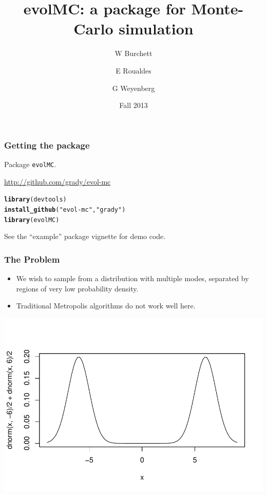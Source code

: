 \documentclass{beamer}\usepackage[]{graphicx}\usepackage[]{color}
\title{evolMC: a package for Monte-Carlo simulation}
\author{W Burchett \and E Roualdes \and G Weyenberg}
\date{Fall 2013}
\makeatletter
\newcommand{\hlstr}[1]{\textcolor[rgb]{0.192,0.494,0.8}{#1}}%
\newcommand{\hlstd}[1]{\textcolor[rgb]{0.345,0.345,0.345}{#1}}%
\newcommand{\hlkwd}[1]{\textcolor[rgb]{0.737,0.353,0.396}{\textbf{#1}}}%
\newenvironment{kframe}{%
 \def\at@end@of@kframe{}%
 \ifinner\ifhmode%
  \def\at@end@of@kframe{\end{minipage}}%
  \begin{minipage}{\columnwidth}%
 \fi\fi%
 \def\FrameCommand##1{\hskip\@totalleftmargin \hskip-\fboxsep
 \colorbox{shadecolor}{##1}\hskip-\fboxsep
     \hskip-\linewidth \hskip-\@totalleftmargin \hskip\columnwidth}%
 \MakeFramed {\advance\hsize-\width
   \@totalleftmargin\z@ \linewidth\hsize
   \@setminipage}}%
 {\par\unskip\endMakeFramed%
 \at@end@of@kframe}
\newenvironment{knitrout}{}{} %
\makeatother
\begin{document}
\begin{frame}
\maketitle
\end{frame}

\begin{frame}[fragile]
  \frametitle{Getting the package}
  Package {\tt evolMC}.
 
  \url{http://github.com/grady/evol-mc}
\begin{knitrout}
\color{fgcolor}\begin{kframe}
\begin{alltt}
\hlkwd{library}\hlstd{(devtools)}
\hlkwd{install_github}\hlstd{(}\hlstr{"evol-mc"}\hlstd{,} \hlstr{"grady"}\hlstd{)}
\hlkwd{library}\hlstd{(evolMC)}
\end{alltt}
\end{kframe}
\end{knitrout}

See the ``example'' package vignette for demo code.
\end{frame}

\begin{frame}
  \frametitle{The Problem}
  \begin{itemize}
  \item We wish to sample from a distribution with multiple modes, separated by regions of very low probability density.

    \item Traditional Metropolis algorithms do not work well here.
      

  \end{itemize}

\begin{center}
\includegraphics[scale=0.6]{figure/bimodal}  
\end{center}

\end{frame}
\end{document}

